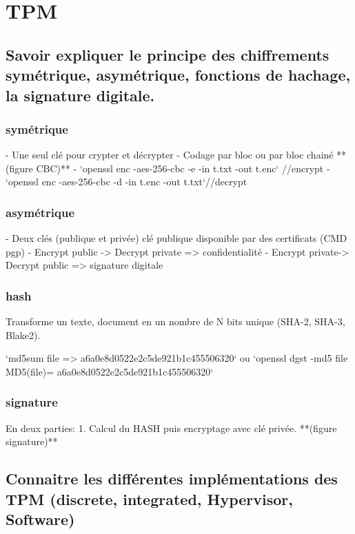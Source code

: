 \documentclass[resume]{uboot}
\begin{document}
\section{TPM}

\subsection{Savoir expliquer le principe des chiffrements symétrique, asymétrique, fonctions de hachage, la signature digitale.}

\subsubsection{symétrique}

- Une seul clé pour crypter et décrypter
- Codage par bloc ou par bloc chainé **(figure CBC)** 
- `openssl enc -aes-256-cbc -e -in t.txt -out t.enc` //encrypt
- `openssl enc -aes-256-cbc -d -in t.enc -out t.txt`//decrypt

\subsubsection{asymétrique}

- Deux clés (publique et privée) clé publique disponible par des certificats (CMD pgp)
- Encrypt public -> Decrypt private => confidentialité
- Encrypt private-> Decrypt public => signature digitale

\subsubsection{hash}

Transforme un texte, document en un nombre de N bits unique (SHA-2, SHA-3, Blake2).

`md5sum file => a6a0e8d0522e2c5de921b1c455506320` ou `openssl dgst -md5 file MD5(file)= a6a0e8d0522e2c5de921b1c455506320`  

\subsubsection{signature}

En deux parties: 1. Calcul du HASH puis encryptage avec clé privée. **(figure signature)**

\subsection{Connaitre les différentes implémentations des TPM (discrete, integrated, Hypervisor, Software)}
\end{document}
